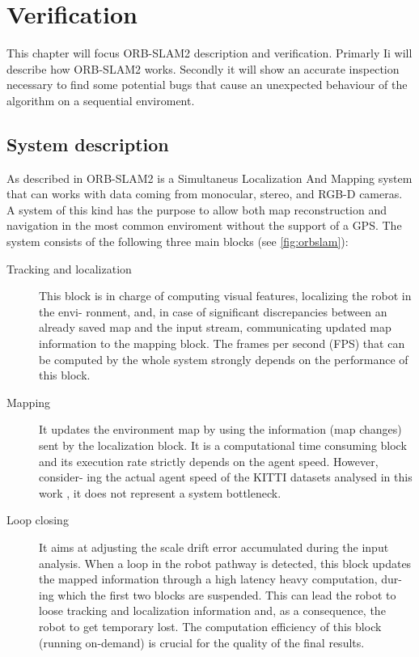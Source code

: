 \chapter{Verification} \label{chap:verification}
This chapter will focus ORB-SLAM2 description and verification.
Primarly Ii will describe how ORB-SLAM2 works.
Secondly it will show an accurate inspection necessary to find some potential bugs that cause an unexpected behaviour of the algorithm on a sequential enviroment.

 \section{System description}
 As described in \cite{iros2019} ORB-SLAM2 is a Simultaneus Localization And Mapping system that can works with data coming from monocular, stereo, and RGB-D cameras. A system of this kind has the purpose to allow both map reconstruction and navigation in the most common enviroment without the support of  a GPS.
 The system consists of the following three main blocks (see \ref{fig:orbslam}):

\begin{description}
	\item[Tracking and localization] 
	This block is in charge of computing visual features, localizing the robot in the envi- ronment, and, in case of significant discrepancies between an already saved map and the input stream, communicating updated map information to the mapping block. The frames per second (FPS) that can be computed by the whole system strongly depends on the performance of this block.
	\item[Mapping] 
	It updates the environment map by using the information (map changes) sent by the localization block. It is a computational time consuming block and its execution rate strictly depends on the agent speed. However, consider- ing the actual agent speed of the KITTI datasets analysed in this work \cite{CVPR2012}, it does not represent a system bottleneck.
	\item[Loop closing] 
	It aims at adjusting the scale drift error accumulated during the input analysis. When a loop in the robot pathway is detected, this block updates the mapped information through a high latency heavy computation, dur- ing which the first two blocks are suspended. This can lead the robot to loose tracking and localization information and, as a consequence, the robot to get temporary lost. The computation efficiency of this block (running on-demand) is crucial for the quality of the final results.
	
\end{description}

